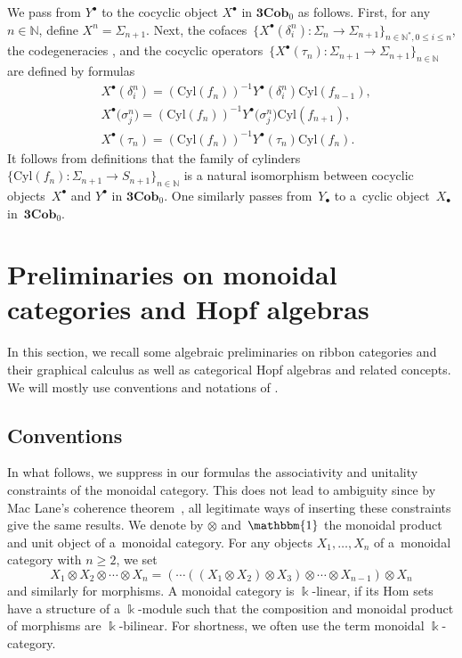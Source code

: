 \documentclass[10pt,a4paper]{amsart}
\numberwithin{equation}{section}
\newcommand{\co}{\colon}
\newcommand{\tens}{\otimes}
\newcommand{\N}{\mathbb{N}}
\newcommand{\Cyl}{\mathrm{Cyl}}
\newcommand{\Cob}{\textbf{Cob}}
\newcommand{\kk}{\Bbbk}
\newcommand{\uu}{\mathbbm{1}}
\begin{document}
We pass from $Y^\bullet$ to the cocyclic object $X^\bullet$ in $\textbf{3}\Cob_0$ as follows.
First, for any $n\in \N$, define $X^n=\Sigma_{n+1}$.
Next, the cofaces~$\{X^\bullet(\delta_i^n) \co \Sigma_n \to \Sigma_{n+1}\}_{n\in \N^*, 0\le i \le n}$, the codegeneracies \smash{$\bigl\{X^\bullet\bigl(\sigma_j^n\bigr) \co \Sigma_{n+2} \to \Sigma_{n+1}\bigr\}_{n\in \N, 0\le j \le n}$}, and the cocyclic operators~$\{X^\bullet(\tau_n) \co \Sigma_{n+1} \to \Sigma_{n+1}\}_{n\in\N}$ are defined by formulas
\begin{align*}
	&X^\bullet(\delta_i^n)=(\Cyl({f_n}))^{-1}Y^\bullet(\delta_i^n)\Cyl({f_{n-1}}), \\
	&X^\bullet\bigl(\sigma_j^n\bigr)=(\Cyl({f_n}))^{-1}Y^\bullet\bigl(\sigma_j^n\bigr)\Cyl({f_{n+1}}), \\
	&X^\bullet(\tau_n)=(\Cyl({f_n}))^{-1}Y^\bullet(\tau_n)\Cyl({f_n}).
\end{align*}
It follows from definitions that the family of cylinders~$\{\Cyl({f_n})\co \Sigma_{n+1} \to S_{n+1}\}_{n\in \N}$ is a natural isomorphism between cocyclic objects~$X^\bullet$ and $Y^\bullet$ in $\textbf{3}\Cob_0$. One similarly passes from~$Y_\bullet$ to a~cyclic object~$X_\bullet$ in~$\textbf{3}\Cob_0$.


\section{Preliminaries on monoidal categories and Hopf algebras}\label{catprelimini}

In this section, we recall some algebraic preliminaries on ribbon categories and their graphical calculus as well as categorical Hopf algebras and related concepts. We will mostly use conventions and notations of \cite{moncatstft}.

\subsection{Conventions} In what follows, we suppress in our formulas the associativity and unitality constraints of the monoidal category. This does not lead to ambiguity since by Mac Lane's coherence
theorem~\cite{maclane63}, all legitimate ways of inserting these constraints give the same results. We denote by $\tens$ and~$\uu$ the monoidal product and unit object of a~monoidal category. For any objects $X_1, \dots, X_n$ of a~monoidal category with $n\ge 2$, we set
\[
X_1 \tens X_2 \tens \cdots \tens X_n=(\cdots ((X_1\tens X_2)\tens X_3)\tens \cdots \tens X_{n-1} )\tens X_n
\]
and similarly for morphisms.
A monoidal category is $\kk$-linear, if its Hom sets have a structure of a $\kk$-module such that the composition and monoidal product of morphisms are $\kk$-bilinear. For shortness, we often use the term monoidal $\kk$-category.
\end{document}
